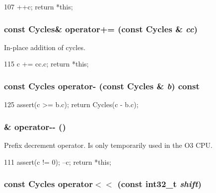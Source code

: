 \begin{DoxyCode}
107     { ++c; return *this; }
\end{DoxyCode}
\hypertarget{classCycles_a54b902ad3a773dfac1ff745334f256b4}{
\subsubsection[{operator+=}]{\setlength{\rightskip}{0pt plus 5cm}const {\bf Cycles}\& operator+= (const {\bf Cycles} \& {\em cc})}}
\label{classCycles_a54b902ad3a773dfac1ff745334f256b4}
In-\/place addition of cycles. 


\begin{DoxyCode}
115     { c += cc.c; return *this; }
\end{DoxyCode}
\hypertarget{classCycles_ac99b1986ebeb3ed9e85b1b1192417458}{
\subsubsection[{operator-\/}]{\setlength{\rightskip}{0pt plus 5cm}const {\bf Cycles} operator-\/ (const {\bf Cycles} \& {\em b}) const}}
\label{classCycles_ac99b1986ebeb3ed9e85b1b1192417458}



\begin{DoxyCode}
125     { assert(c >= b.c); return Cycles(c - b.c); }
\end{DoxyCode}
\hypertarget{classCycles_acd85c1242965524268337c9d61b45677}{
\subsubsection[{operator-\/-\/}]{\& operator-\/-\/ ()}}
\label{classCycles_acd85c1242965524268337c9d61b45677}
Prefix decrement operator. Is only temporarily used in the O3 CPU. 


\begin{DoxyCode}
111     { assert(c != 0); --c; return *this; }
\end{DoxyCode}
\hypertarget{classCycles_ae87fefe7d6f57befde4164db9ddaf18d}{
\subsubsection[{operator$<$$<$}]{\setlength{\rightskip}{0pt plus 5cm}const {\bf Cycles} operator$<$$<$ (const int32\_\-t {\em shift})}}
\label{classCycles_ae87fefe7d6f57befde4164db9ddaf18d}




